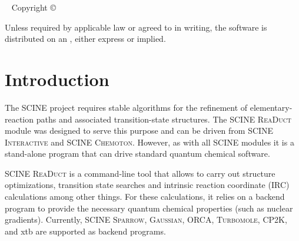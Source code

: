 \documentclass[]{tufte-book}
\title[SCINE ReaDuct manual]{User Manual \vskip 0.5em {\setlength{\parindent}{0pt} \Huge SCINE ReaDuct 4.0.0}}
\author[The SCINE ReaDuct Developers]{The SCINE ReaDuct Developers: \newline \noindent Christoph Brunken, Katja-Sophia Csizi, Stephanie Grimmel, Stefan Gugler, Jan-Grimo Sobez, Miguel Steiner, Paul T\"urtscher, Jan Unsleber, Alain C. Vaucher, Thomas Weymuth, and Markus Reiher}
\newcommand{\monthyear}{%
  \ifcase\month\or January\or February\or March\or April\or May\or June\or
  July\or August\or September\or October\or November\or
  December\fi\space\number\year
}
\begin{document}
\setlength{\parindent}{0pt}

\frontmatter


\maketitle


\newpage
\begin{fullwidth}
~\vfill
\thispagestyle{empty}
\setlength{\parindent}{0pt}
\setlength{\parskip}{\baselineskip}
Copyright \copyright\ \the\year\ \thanklessauthor


\par{}

\par Unless required by applicable law or agreed to in writing, the software
is distributed on an , either express or implied. 

\end{fullwidth}

\tableofcontents




\mainmatter

\let\cleardoublepage\clearpage
\chapter{Introduction}

The SCINE project requires stable algorithms for the refinement of elementary-reaction paths and associated transition-state
structures. The SCINE \textsc{ReaDuct} module was designed to serve this purpose and can be driven from SCINE \textsc{Interactive}
and SCINE \textsc{Chemoton}. However, as with all SCINE modules it is a stand-alone program that can drive standard quantum
chemical software.

SCINE \textsc{ReaDuct} is a command-line tool that allows to carry out structure optimizations, transition state searches
and intrinsic reaction coordinate (IRC) calculations among other things.
For these calculations, it relies on a backend program to provide the necessary quantum chemical properties (such
as nuclear gradients). Currently, SCINE \textsc{Sparrow}\cite{sparrow}, \textsc{Gaussian}\cite{gaussian09}, ORCA\cite{orca},
\textsc{Turbomole}\cite{turbomole}, CP2K\cite{cp2k}, and xtb\cite{xtb} are supported as backend programs.
\end{document}
